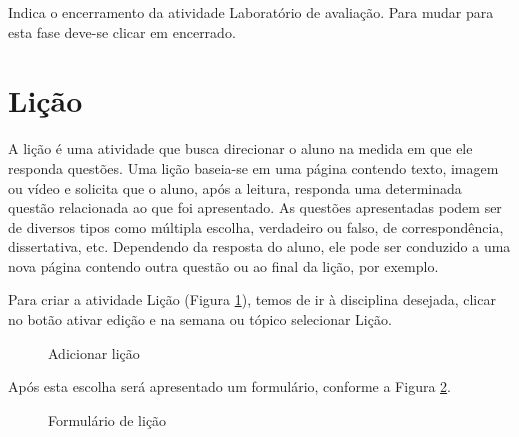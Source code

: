 Indica o encerramento da atividade Laboratório de avaliação. Para mudar para esta fase deve-se clicar em encerrado.

\section{Lição}

A lição é uma atividade que busca direcionar o aluno na medida em que ele responda questões. Uma lição baseia-se em uma página contendo texto, imagem ou vídeo e solicita que o aluno, após a leitura, responda uma determinada questão relacionada ao que foi apresentado. As questões apresentadas podem ser de diversos tipos como múltipla escolha, verdadeiro ou falso, de correspondência, dissertativa, etc. Dependendo da resposta do aluno, ele pode ser conduzido a uma nova página contendo outra questão ou ao final da lição, por exemplo.

Para criar a atividade Lição (Figura \ref{fig:add_licao}), temos de ir à disciplina desejada, clicar no botão ativar edição e na semana ou tópico selecionar Lição.

\begin{figure}[htbp]
 \begin{center}
  \caption{Adicionar lição}
  \label{fig:add_licao}
 \end{center}
\end{figure}

Após esta escolha será apresentado um formulário, conforme a Figura \ref{fig:form_licao}.

\begin{figure}
 \begin{center}
  \caption{Formulário de lição}
  \label{fig:form_licao}
 \end{center}
\end{figure}

